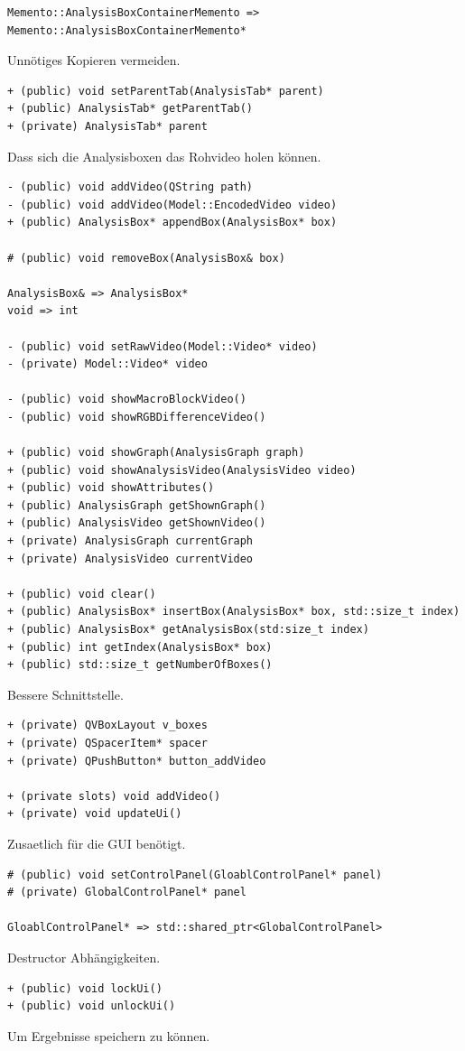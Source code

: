 \documentclass{scrartcl}
\begin{document}
{\begin{verbatim}
Memento::AnalysisBoxContainerMemento => Memento::AnalysisBoxContainerMemento*
\end{verbatim}
Unnötiges Kopieren vermeiden.
\bigskip
\begin{verbatim}
+ (public) void setParentTab(AnalysisTab* parent)
+ (public) AnalysisTab* getParentTab()
+ (private) AnalysisTab* parent
\end{verbatim}
Dass sich die Analysisboxen das Rohvideo holen können.
\bigskip
\begin{verbatim}
- (public) void addVideo(QString path)
- (public) void addVideo(Model::EncodedVideo video)
+ (public) AnalysisBox* appendBox(AnalysisBox* box)

# (public) void removeBox(AnalysisBox& box)

AnalysisBox& => AnalysisBox*
void => int

- (public) void setRawVideo(Model::Video* video)
- (private) Model::Video* video

- (public) void showMacroBlockVideo()
- (public) void showRGBDifferenceVideo()

+ (public) void showGraph(AnalysisGraph graph)
+ (public) void showAnalysisVideo(AnalysisVideo video)
+ (public) void showAttributes()
+ (public) AnalysisGraph getShownGraph()
+ (public) AnalysisVideo getShownVideo()
+ (private) AnalysisGraph currentGraph
+ (private) AnalysisVideo currentVideo

+ (public) void clear()
+ (public) AnalysisBox* insertBox(AnalysisBox* box, std::size_t index)
+ (public) AnalysisBox* getAnalysisBox(std:size_t index)
+ (public) int getIndex(AnalysisBox* box)
+ (public) std::size_t getNumberOfBoxes()
\end{verbatim}
Bessere Schnittstelle.
\bigskip
\begin{verbatim}
+ (private) QVBoxLayout v_boxes
+ (private) QSpacerItem* spacer
+ (private) QPushButton* button_addVideo

+ (private slots) void addVideo()
+ (private) void updateUi()
\end{verbatim}
Zusaetlich für die GUI benötigt.
\bigskip
\begin{verbatim}
# (public) void setControlPanel(GloablControlPanel* panel)
# (private) GlobalControlPanel* panel

GloablControlPanel* => std::shared_ptr<GlobalControlPanel>
\end{verbatim}
Destructor Abhängigkeiten.
\begin{verbatim}
+ (public) void lockUi()
+ (public) void unlockUi()
\end{verbatim}
Um Ergebnisse speichern zu können.
\newpage
}
\end{document}
